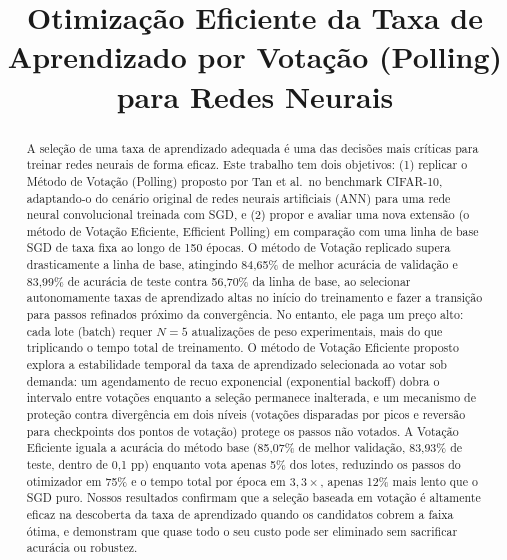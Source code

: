 \documentclass[conference]{IEEEtran}
\begin{document}
\title{Otimização Eficiente da Taxa de Aprendizado por Votação (Polling) para Redes Neurais}

\author{
\and
{}
}

\maketitle

\begin{abstract}
A seleção de uma taxa de aprendizado adequada é uma das decisões mais críticas para treinar redes neurais de forma eficaz. Este trabalho tem dois objetivos: (1) replicar o Método de Votação (Polling) proposto por Tan et al.\ no benchmark CIFAR-10, adaptando-o do cenário original de redes neurais artificiais (ANN) para uma rede neural convolucional treinada com SGD, e (2) propor e avaliar uma nova extensão (o método de Votação Eficiente, Efficient Polling) em comparação com uma linha de base SGD de taxa fixa ao longo de 150 épocas. O método de Votação replicado supera drasticamente a linha de base, atingindo 84,65\% de melhor acurácia de validação e 83,99\% de acurácia de teste contra 56,70\% da linha de base, ao selecionar autonomamente taxas de aprendizado altas no início do treinamento e fazer a transição para passos refinados próximo da convergência. No entanto, ele paga um preço alto: cada lote (batch) requer $N=5$ atualizações de peso experimentais, mais do que triplicando o tempo total de treinamento. O método de Votação Eficiente proposto explora a estabilidade temporal da taxa de aprendizado selecionada ao votar sob demanda: um agendamento de recuo exponencial (exponential backoff) dobra o intervalo entre votações enquanto a seleção permanece inalterada, e um mecanismo de proteção contra divergência em dois níveis (votações disparadas por picos e reversão para checkpoints dos pontos de votação) protege os passos não votados. A Votação Eficiente iguala a acurácia do método base (85,07\% de melhor validação, 83,93\% de teste, dentro de 0,1 pp) enquanto vota apenas 5\% dos lotes, reduzindo os passos do otimizador em 75\% e o tempo total por época em $3,3\times$, apenas 12\% mais lento que o SGD puro. Nossos resultados confirmam que a seleção baseada em votação é altamente eficaz na descoberta da taxa de aprendizado quando os candidatos cobrem a faixa ótima, e demonstram que quase todo o seu custo pode ser eliminado sem sacrificar acurácia ou robustez.
\end{abstract}
\end{document}
